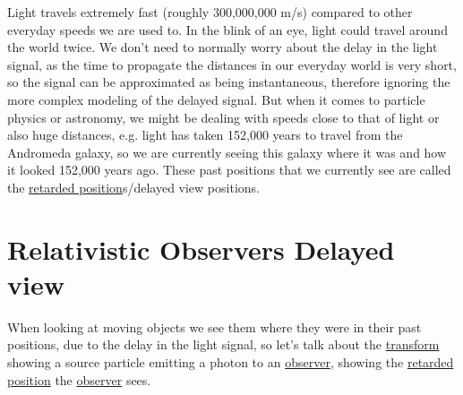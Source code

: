 Light travels extremely fast (roughly 300,000,000 m/s) compared to other everyday speeds we are used to. In the blink of an eye, light could travel around the world twice. We don't need to normally worry about the delay in the light signal, as the time to propagate the distances in our everyday world is very short, so the signal can be approximated as being instantaneous, therefore ignoring the more complex modeling of the delayed signal. But when it comes to particle physics or astronomy, we might be dealing with speeds close to that of light or also huge distances, e.g. light has taken 152,000 years to travel from the Andromeda galaxy, so we are currently seeing this galaxy where it was and how it looked 152,000 years ago. These past positions that we currently see are called the \hyperlink{def-retarded-position}{retarded position}s/delayed view positions.

\section{Relativistic Observers Delayed view}

When looking at moving objects we see them where they were in their past positions, due to the delay in the light signal, so let's talk about the \hyperlink{def-transform}{transform} showing a source particle emitting a photon to an \hyperlink{def-observer}{observer}, showing the \hyperlink{def-retarded-position}{retarded position} the \hyperlink{def-observer}{observer} sees.

